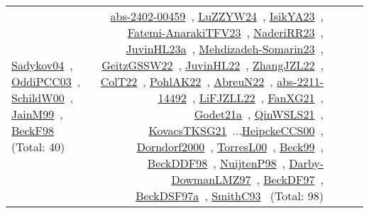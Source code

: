 {\begin{longtable}{p{3cm}r>{\raggedright\arraybackslash}p{6cm}>{\raggedright\arraybackslash}p{6cm}>{\raggedright\arraybackslash}p{8cm}}
\href{../works/Sadykov04.pdf}{Sadykov04}~\cite{Sadykov04}, \href{../works/OddiPCC03.pdf}{OddiPCC03}~\cite{OddiPCC03}, \href{../works/SchildW00.pdf}{SchildW00}~\cite{SchildW00}, \href{../works/JainM99.pdf}{JainM99}~\cite{JainM99}, \href{../works/BeckF98.pdf}{BeckF98}~\cite{BeckF98} (Total: 40) & \href{../works/abs-2402-00459.pdf}{abs-2402-00459}~\cite{abs-2402-00459}, \href{../works/LuZZYW24.pdf}{LuZZYW24}~\cite{LuZZYW24}, \href{../works/IsikYA23.pdf}{IsikYA23}~\cite{IsikYA23}, \href{../works/Fatemi-AnarakiTFV23.pdf}{Fatemi-AnarakiTFV23}~\cite{Fatemi-AnarakiTFV23}, \href{../works/NaderiRR23.pdf}{NaderiRR23}~\cite{NaderiRR23}, \href{../works/JuvinHL23a.pdf}{JuvinHL23a}~\cite{JuvinHL23a}, \href{../works/Mehdizadeh-Somarin23.pdf}{Mehdizadeh-Somarin23}~\cite{Mehdizadeh-Somarin23}, \href{../works/GeitzGSSW22.pdf}{GeitzGSSW22}~\cite{GeitzGSSW22}, \href{../works/JuvinHL22.pdf}{JuvinHL22}~\cite{JuvinHL22}, \href{../works/ZhangJZL22.pdf}{ZhangJZL22}~\cite{ZhangJZL22}, \href{../works/ColT22.pdf}{ColT22}~\cite{ColT22}, \href{../works/PohlAK22.pdf}{PohlAK22}~\cite{PohlAK22}, \href{../works/AbreuN22.pdf}{AbreuN22}~\cite{AbreuN22}, \href{../works/abs-2211-14492.pdf}{abs-2211-14492}~\cite{abs-2211-14492}, \href{../works/LiFJZLL22.pdf}{LiFJZLL22}~\cite{LiFJZLL22}, \href{../works/FanXG21.pdf}{FanXG21}~\cite{FanXG21}, \href{../works/Godet21a.pdf}{Godet21a}~\cite{Godet21a}, \href{../works/QinWSLS21.pdf}{QinWSLS21}~\cite{QinWSLS21}, \href{../works/KovacsTKSG21.pdf}{KovacsTKSG21}~\cite{KovacsTKSG21}...\href{../works/HeipckeCCS00.pdf}{HeipckeCCS00}~\cite{HeipckeCCS00}, \href{../works/Dorndorf2000.pdf}{Dorndorf2000}~\cite{Dorndorf2000}, \href{../works/TorresL00.pdf}{TorresL00}~\cite{TorresL00}, \href{../works/Beck99.pdf}{Beck99}~\cite{Beck99}, \href{../works/BeckDDF98.pdf}{BeckDDF98}~\cite{BeckDDF98}, \href{../works/NuijtenP98.pdf}{NuijtenP98}~\cite{NuijtenP98}, \href{../works/Darby-DowmanLMZ97.pdf}{Darby-DowmanLMZ97}~\cite{Darby-DowmanLMZ97}, \href{../works/BeckDF97.pdf}{BeckDF97}~\cite{BeckDF97}, \href{../works/BeckDSF97a.pdf}{BeckDSF97a}~\cite{BeckDSF97a}, \href{../works/SmithC93.pdf}{SmithC93}~\cite{SmithC93} (Total: 98)\\
\end{longtable}
}

\clearpage
